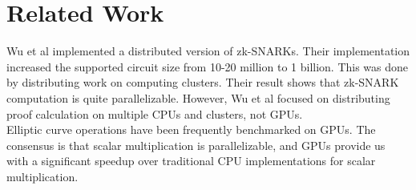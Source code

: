 \section{Related Work}

Wu et al\cite{wu2018dizk} implemented a distributed version of zk-SNARKs. Their implementation increased the supported circuit size from 10-20 million to 1 billion. This was done by distributing work on computing clusters. Their result shows that zk-SNARK computation is quite parallelizable. However, Wu et al focused on distributing proof calculation on multiple CPUs and clusters, not GPUs.
\\
Elliptic curve operations have been frequently benchmarked on GPUs\cite{mahefast, bernstein2010ecc2k, antao2010elliptic}. The consensus is that scalar multiplication is parallelizable, and GPUs provide us with a significant speedup over traditional CPU implementations for scalar multiplication.